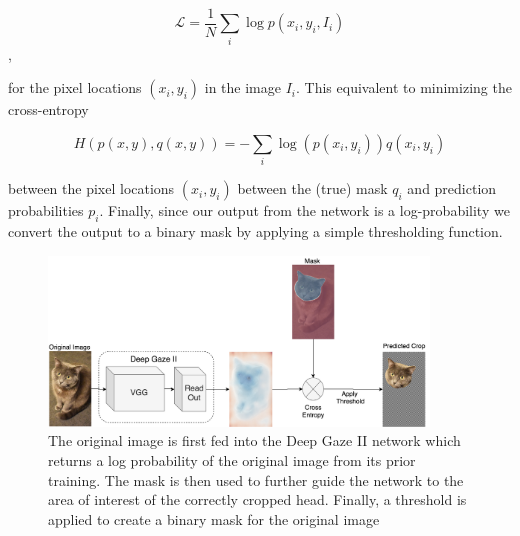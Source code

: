 \documentclass[portrait]{sciposter}
\begin{document}
\begin{multicols}{2}
$$ \mathcal{L} = \frac{1}{N} \sum_i \log{p(x_i,y_i,I_i)}  $$,

for the pixel locations $(x_i,y_i)$ in the image $I_i$. This equivalent to minimizing the cross-entropy 

$$ H(p(x,y),q(x,y)) = - \sum_i \log{\left(p(x_i,y_i)\right)} q(x_i,y_i)  $$ 

between the pixel locations $(x_i,y_i)$ between the (true) mask $q_i$ and prediction probabilities $p_i$. 
Finally, since our output from the network is a log-probability we convert the output to a binary mask by applying a simple thresholding function.


\begin{figure}
	\centering
	\includegraphics[width=0.9\textwidth]{CropPrediction.png}
	\caption{\small The original image is first fed into the Deep Gaze II network which returns a log probability of the original image from its prior training. The mask is then used to further guide the network to the area of interest of the correctly cropped head. Finally, a threshold is applied to create a binary mask for the original image}
\end{figure}





\end{multicols}
\end{document}
